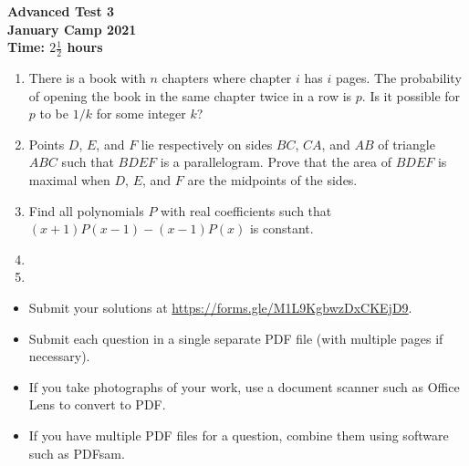 \documentclass{article}
\begin{document}
\thispagestyle{empty}

\begin{center}
  \textbf{\Large Advanced Test 3}
  \\ \vspace{1em}
  \textbf{\large January Camp 2021}
  \\ \vspace{1em}
  \textbf{\large Time: $2\frac{1}{2}$ hours}
\end{center}

\vspace{24pt}

\begin{enumerate}[1.]

\item %
There is a book with $n$ chapters where chapter $i$ has $i$ pages.
The probability of opening the book in the same chapter twice in a row is $p$.
Is it possible for $p$ to be $1/k$ for some integer $k$?


\item %
Points $D$, $E$, and $F$ lie respectively on sides $BC$, $CA$, and $AB$ of triangle $ABC$ such that $BDEF$ is a parallelogram. Prove that the area of $BDEF$ is maximal when $D$, $E$, and $F$ are the midpoints of the sides.


\item %
Find all polynomials $P$ with real coefficients such that $(x + 1)P(x - 1) - (x - 1)P(x)$ is constant.


\item %


\item %

\end{enumerate}


\vfill
\begin{itemize}
	\item Submit your solutions at \url{https://forms.gle/M1L9KgbwzDxCKEjD9}.
	\item Submit each question in a single separate PDF file (with multiple pages if necessary).
	\item If you take photographs of your work, use a document scanner such as Office Lens to convert to PDF.
	\item If you have multiple PDF files for a question, combine them using software such as PDFsam.
\end{itemize}
\end{document}
